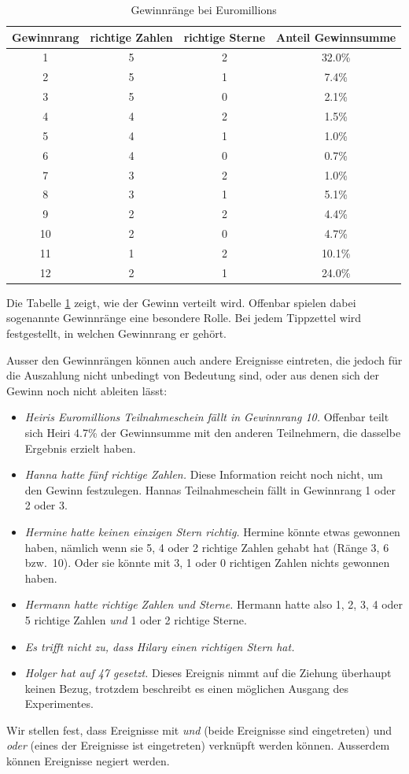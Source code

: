 \begin{table}
\begin{center}
\begin{tabular}{|c|c|c|c|}
\hline
Gewinnrang&richtige Zahlen&richtige Sterne&Anteil Gewinnsumme\\
\hline
1&5&2&32.0\%\\
2&5&1&7.4\%\\
3&5&0&2.1\%\\
4&4&2&1.5\%\\
5&4&1&1.0\%\\
6&4&0&0.7\%\\
7&3&2&1.0\%\\
8&3&1&5.1\%\\
9&2&2&4.4\%\\
10&2&0&4.7\%\\
11&1&2&10.1\%\\
12&2&1&24.0\%\\
\hline
\end{tabular}
\end{center}
\caption{Gewinnränge bei Euromillions\label{gewinnraenge}}
\end{table}

Die Tabelle \ref{gewinnraenge} zeigt, wie der Gewinn verteilt wird.
Offenbar spielen dabei sogenannte Gewinnränge eine besondere Rolle.
Bei jedem Tippzettel wird festgestellt, in welchen Gewinnrang er
gehört.

Ausser den Gewinnrängen können auch andere Ereignisse eintreten,
die jedoch für die Auszahlung nicht unbedingt von Bedeutung sind,
oder aus denen sich der Gewinn noch nicht ableiten lässt:
\begin{itemize}
\item {\it Heiris Euromillions Teilnahmeschein fällt in Gewinnrang 10.}
Offenbar teilt sich Heiri 4.7\% der Gewinnsumme mit den anderen Teilnehmern,
die dasselbe Ergebnis erzielt haben.
\item {\it Hanna hatte fünf richtige Zahlen.}
Diese Information reicht noch nicht, um den Gewinn festzulegen.
Hannas Teilnahmeschein fällt in Gewinnrang 1 oder 2 oder 3.
\item {\it Hermine hatte keinen einzigen Stern richtig.}
Hermine könnte
etwas gewonnen haben, nämlich wenn sie 5, 4 oder 2 richtige Zahlen
gehabt hat (Ränge 3, 6 bzw.~10).
Oder sie könnte mit 3, 1 oder 0 richtigen Zahlen nichts gewonnen haben.
\item {\it Hermann hatte richtige Zahlen und Sterne.}
Hermann hatte also 1, 2, 3, 4 oder 5 richtige Zahlen {\em und}
1 oder 2 richtige Sterne.
\item {\it Es trifft nicht zu, dass Hilary einen richtigen Stern hat.}
\item {\it Holger hat auf 47 gesetzt.}
Dieses Ereignis nimmt auf die Ziehung überhaupt keinen Bezug,
trotzdem beschreibt es einen möglichen Ausgang des Experimentes.
\end{itemize}
Wir stellen fest, dass Ereignisse mit {\em und} (beide Ereignisse sind
eingetreten) und {\em oder} (eines der Ereignisse ist
eingetreten) verknüpft werden können.
Ausserdem können Ereignisse negiert werden.

